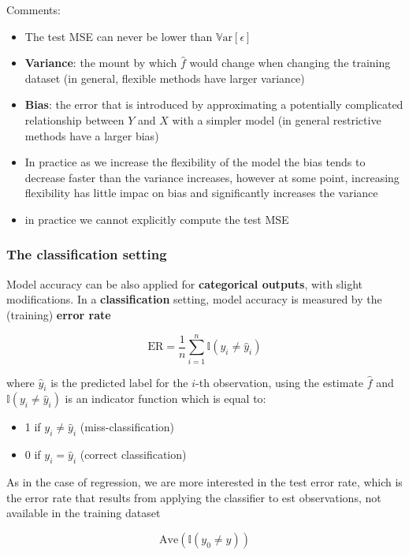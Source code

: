 \documentclass[11pt]{article}
\begin{document}
Comments:
\begin{itemize}
    \item The test MSE can never be lower than $\mathbb{V}\text{ar}[\epsilon]$
    \item \textbf{Variance}: the mount by which $\hat{f}$ would change when changing the training dataset (in general, flexible methods have larger variance)
    \item \textbf{Bias}: the error that is introduced by approximating a potentially complicated relationship between $Y$ and $X$ with a simpler model (in general restrictive methods have a larger bias)
    \item In practice as we increase the flexibility of the model the bias tends to decrease faster than the variance increases, however at some point, increasing flexibility has little impac on bias and significantly increases the variance
    \item in practice we cannot explicitly compute the test MSE
\end{itemize}

\subsubsection{The classification setting}
Model accuracy can be also applied for \textbf{categorical outputs}, with slight modifications.
In a \textbf{classification} setting, model accuracy is measured by the (training) \textbf{error rate}

\begin{equation}
    \text{ER} = \dfrac{1}{n} \sum_{i=1}^{n} \mathbb{I}(y_i \neq \hat{y}_i)
\end{equation}

where $\hat{y}_i$ is the predicted label for the $i$-th observation, using the estimate $\hat{f}$ and $\mathbb{I}(y_i \neq \hat{y}_i)$ is an indicator function which is equal to:

\begin{itemize}
    \item 1 if $y_i \neq \hat{y}_i$ (miss-classification)
    \item 0 if $y_i = \hat{y}_i$ (correct classification)
\end{itemize}

As in the case of regression, we are more interested in the test error rate, which is the error rate that results from applying the classifier to est observations, not available in the training dataset

\[\text{Ave} (\mathbb{I}(y_0 \neq \hat{y}))\]
\end{document}
